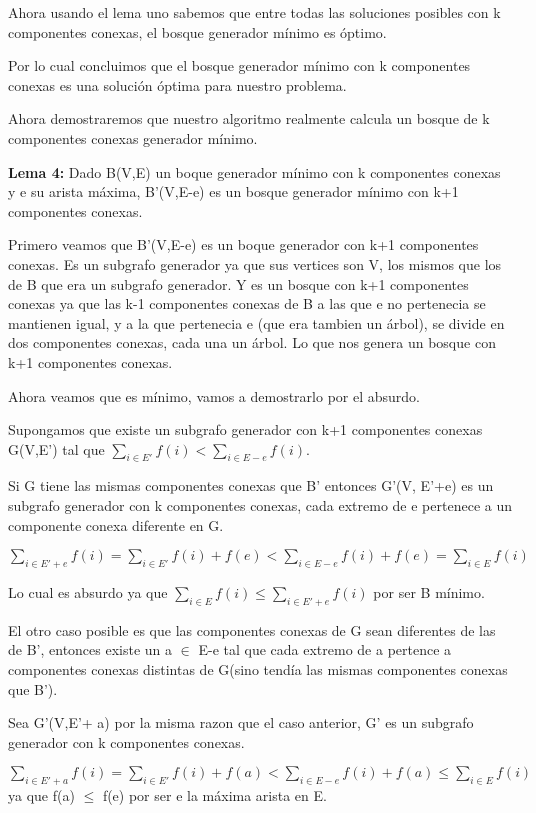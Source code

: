 Ahora usando el lema uno sabemos que entre todas las soluciones posibles con k componentes conexas, el bosque generador mínimo es óptimo.

Por lo cual concluimos que el bosque generador mínimo con k componentes conexas es una solución óptima para nuestro problema.

Ahora demostraremos que nuestro algoritmo realmente calcula un bosque de k componentes conexas generador mínimo.

\textbf{Lema 4:} Dado B(V,E) un boque generador mínimo con k componentes conexas y e su arista máxima, B'(V,E-e) es un bosque generador mínimo con k+1 componentes conexas.

Primero veamos que B'(V,E-e) es un boque generador con k+1 componentes conexas. Es un subgrafo generador ya que sus vertices son V, los mismos que los de B que era un subgrafo generador. Y es un bosque con k+1 componentes conexas ya que las k-1 componentes conexas de B a las que e no pertenecia se mantienen igual, y a la que pertenecia e (que era tambien un árbol), se divide en dos componentes conexas, cada una un árbol. Lo que nos genera un bosque con k+1 componentes conexas.

Ahora veamos que es mínimo, vamos a demostrarlo por el absurdo.

Supongamos que existe un subgrafo generador con k+1 componentes conexas G(V,E') tal que $\sum_{i \in E'} f(i) < \sum_{i \in E-e} f(i)$.

Si G tiene las mismas componentes conexas que B' entonces G'(V, E'+e) es un subgrafo generador con k componentes conexas, cada extremo de e pertenece a un componente conexa diferente en G.

$\sum_{i \in E'+e} f(i) = \sum_{i \in E'} f(i) + f(e) < \sum_{i \in E-e} f(i) + f(e) = \sum_{i \in E} f(i)$

Lo cual es absurdo ya que $\sum_{i \in E} f(i) \leq \sum_{i \in E'+e} f(i)$ por ser B mínimo.

El otro caso posible es que las componentes conexas de G sean diferentes de las de B', entonces existe un a $\in$ E-e tal que cada extremo de a pertence a componentes conexas distintas de G(sino tendía las mismas componentes conexas que B').

Sea G'(V,E'+ a) por la misma razon que el caso anterior, G' es un subgrafo generador con k componentes conexas.

$\sum_{i \in E'+a} f(i) = \sum_{i \in E'} f(i) + f(a) < \sum_{i \in E-e} f(i) + f(a) \leq \sum_{i \in E} f(i)$ ya que f(a) $\leq$ f(e) por ser e la máxima arista en E.

